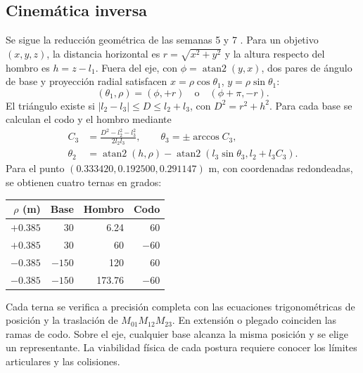 \subsection{Cinemática inversa}
Se sigue la reducción geométrica de las semanas 5 y 7 \parencite{course5,course7}. Para un objetivo $(x,y,z)$, la distancia horizontal es $r=\sqrt{x^2+y^2}$ y la altura respecto del hombro es $h=z-l_1$. Fuera del eje, con $\phi=\operatorname{atan2}(y,x)$, dos pares de ángulo de base y proyección radial satisfacen $x=\rho\cos\theta_1$, $y=\rho\sin\theta_1$:
\begin{equation}
(\theta_1,\rho)=(\phi,+r)\quad\text{o}\quad(\phi+\pi,-r).
\end{equation}
El triángulo existe si $|l_2-l_3|\leq D\leq l_2+l_3$, con $D^2=r^2+h^2$. Para cada base se calculan el codo y el hombro mediante
\begin{align}
C_3&=\frac{D^2-l_2^2-l_3^2}{2l_2l_3},\qquad \theta_3=\pm\arccos C_3,\\
\theta_2&=\operatorname{atan2}(h,\rho)-
\operatorname{atan2}(l_3\sin\theta_3,l_2+l_3 C_3).
\end{align}
Para el punto $(0.333420,0.192500,0.291147)$ m, con coordenadas redondeadas, se obtienen cuatro ternas en grados:
\begin{center}
\begin{tabular}{rrrr}\toprule
$\rho$ (m) & Base & Hombro & Codo\\\midrule
$+0.385$ & 30 & 6.24 & 60\\
$+0.385$ & 30 & 60 & $-60$\\
$-0.385$ & $-150$ & 120 & 60\\
$-0.385$ & $-150$ & 173.76 & $-60$\\\bottomrule
\end{tabular}
\end{center}
Cada terna se verifica a precisión completa con las ecuaciones trigonométricas de posición y la traslación de $M_{01}M_{12}M_{23}$. En extensión o plegado coinciden las ramas de codo. Sobre el eje, cualquier base alcanza la misma posición y se elige un representante. La viabilidad física de cada postura requiere conocer los límites articulares y las colisiones.
